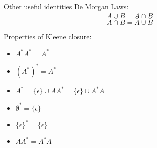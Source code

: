 \begin{slide}[bm=,toc=]{Other useful identities}
De Morgan Laws:
\[
\overline{A \cup B} = \bar{A} \cap \bar{B}  
\]
\[
\overline{A \cap B} = \bar{A} \cup \bar{B}  
\]

Properties of Kleene closure:
\begin{itemize}
\item $A^*A^* = A^*$
\item $(A^*)^* = A^*$
\item $A^* = \{\epsilon\} \cup AA^* = \{\epsilon\}\cup A^*A $
\item $\emptyset^* = \{\epsilon\}$ 
\item $\{\epsilon\}^* = \{\epsilon\}$ 
\item $AA^* = A^*A$ 
\end{itemize}
\end{slide}
